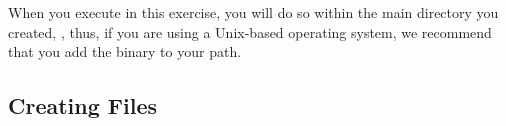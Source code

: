 When you execute \RevBayes in this exercise, you will do so within the main directory you created, , thus, if you are using a Unix-based operating system, we recommend that you add the \RevBayes binary to your path.


%
%

\bigskip

\subsection{Creating \Rev Files}\label{subsect:Exercise-CreatingFiles}

